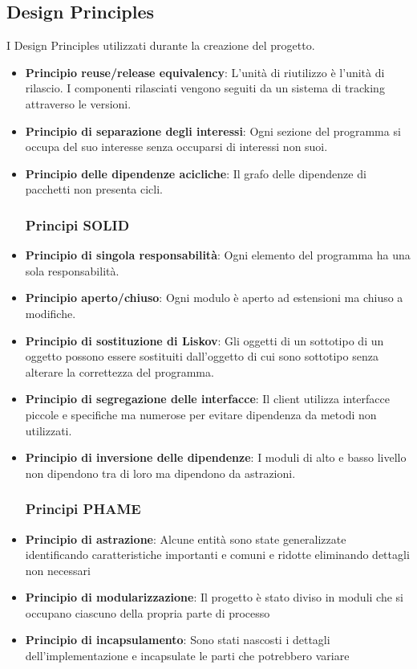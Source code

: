 \documentclass[12pt]{article}
\begin{document}
	\subsection{Design Principles}
	I Design Principles utilizzati durante la creazione del progetto.
	\begin{itemize}
		\item \textbf{Principio reuse/release equivalency}: L'unità di riutilizzo è l'unità di rilascio. I componenti rilasciati vengono seguiti da un sistema di tracking attraverso le versioni.
		\item \textbf{Principio di separazione degli interessi}: Ogni sezione del programma si occupa del suo interesse senza occuparsi di interessi non suoi.
		\item \textbf{Principio delle dipendenze acicliche}: Il grafo delle dipendenze di pacchetti non presenta cicli.
		\subsubsection{Principi SOLID}
		\item \textbf{Principio di singola responsabilità}: Ogni elemento del programma ha una sola responsabilità.
		\item \textbf{Principio aperto/chiuso}: Ogni modulo è aperto ad estensioni ma chiuso a modifiche.
		\item \textbf{Principio di sostituzione di Liskov}: Gli oggetti di un sottotipo di un oggetto possono essere sostituiti dall'oggetto di cui sono sottotipo senza alterare la correttezza del programma.
		\item \textbf{Principio di segregazione delle interfacce}: Il client utilizza interfacce piccole e specifiche ma numerose per evitare dipendenza da metodi non utilizzati.
		\item \textbf{Principio di inversione delle dipendenze}: I moduli di alto e basso livello non dipendono tra di loro ma dipendono da astrazioni.
		\subsubsection{Principi PHAME}
		\item \textbf{Principio di astrazione}: Alcune entità sono state generalizzate identificando caratteristiche importanti e comuni e ridotte eliminando dettagli non necessari
		\item \textbf{Principio di modularizzazione}: Il progetto è stato diviso in moduli che si occupano ciascuno della propria parte di processo 
		 \item \textbf{Principio di incapsulamento}: Sono stati nascosti i dettagli dell'implementazione e incapsulate le parti che potrebbero variare
	\end{itemize}
\end{document}
